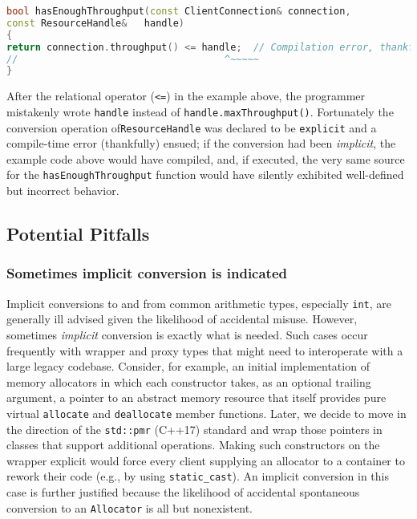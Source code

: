 \begin{lstlisting}[language=C++]
bool hasEnoughThroughput(const ClientConnection& connection,
const ResourceHandle&   handle)
{
return connection.throughput() <= handle;  // Compilation error, thankfully
//                                    ^~~~~~
}
\end{lstlisting}

\noindent After the relational operator (\texttt{<=}) in the example above, the
programmer mistakenly wrote \texttt{handle} instead of
\mbox{\texttt{handle.maxThroughput()}}. Fortunately the conversion operation of\linebreak[4] %
\mbox{\texttt{ResourceHandle}} was declared to be \texttt{explicit} and a
compile-time error (thankfully) ensued; if the conversion had
been \emph{implicit}, the example code above would have compiled, and,
if executed, the very same source for the \mbox{\texttt{hasEnoughThroughput}}
function would have silently exhibited well-defined but incorrect
behavior.

\subsection[Potential Pitfalls]{Potential Pitfalls}\label{potential-pitfalls-explicitconv}

\subsubsection[Sometimes implicit conversion is indicated]{Sometimes implicit conversion is indicated}\label{sometimes-implicit-conversion-is-indicated}

Implicit conversions to and from common arithmetic types, especially
\texttt{int}, are generally ill advised given the likelihood of
accidental misuse. However, sometimes \emph{implicit}
conversion is exactly what is needed. Such cases occur frequently with
wrapper and proxy types that might need to interoperate with a large
legacy codebase. Consider, for example, an initial implementation of
memory allocators in which each constructor takes, as an optional
trailing argument, a pointer to an abstract memory resource that itself
provides pure virtual \texttt{allocate} and \texttt{deallocate} member
functions. Later, we decide to move in the direction of the
\texttt{std::pmr} (C++17) standard and wrap those pointers in classes
that support additional operations. Making such constructors on the
wrapper explicit would force every client supplying an allocator to a
container to rework their code (e.g., by using \texttt{static\_cast}).
An implicit conversion in this case is further justified because the
likelihood of accidental spontaneous conversion to an \texttt{Allocator}
is all but nonexistent.

